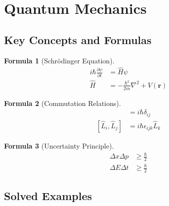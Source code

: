 \documentclass[12pt,a4paper]{article}
\newtheorem{formula}{Formula}[section]
\begin{document}
\section{Quantum Mechanics}

\subsection{Key Concepts and Formulas}

\begin{formula}[Schrödinger Equation]
\begin{align}
i\hbar\frac{\partial \psi}{\partial t} &= \hat{H}\psi\\
\hat{H} &= -\frac{\hbar^2}{2m}\nabla^2 + V(\mathbf{r})
\end{align}
\end{formula}

\begin{formula}[Commutation Relations]
\begin{align}
[\hat{x}_i, \hat{p}_j] &= i\hbar\delta_{ij}\\
[\hat{L}_i, \hat{L}_j] &= i\hbar\epsilon_{ijk}\hat{L}_k
\end{align}
\end{formula}

\begin{formula}[Uncertainty Principle]
\begin{align}
\Delta x \Delta p &\geq \frac{\hbar}{2}\\
\Delta E \Delta t &\geq \frac{\hbar}{2}
\end{align}
\end{formula}

\subsection{Solved Examples}
\end{document}
